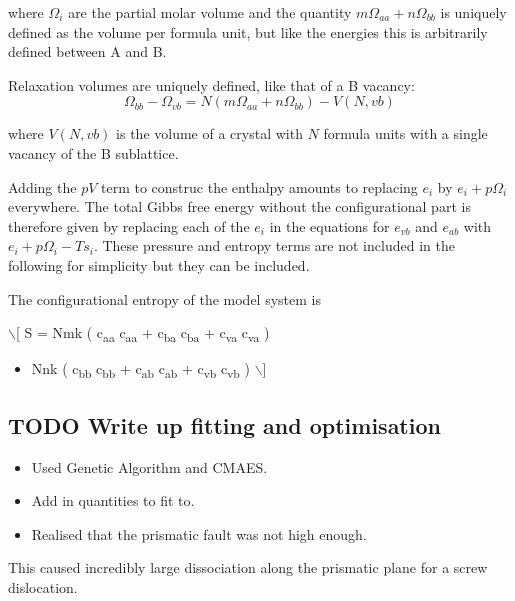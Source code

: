\documentclass[11pt]{article}
\begin{document}
where \(\Omega_i\) are the partial molar volume and the quantity \(m\Omega_{aa} +
n\Omega_{bb}\) is uniquely defined as the volume per formula unit, but like the
energies this is arbitrarily defined between A and B. 


Relaxation volumes are uniquely defined, like that of a B vacancy:
\[ \Omega_{bb} - \Omega_{vb} = N( m \Omega_{aa} + n \Omega_{bb} ) - V(N,vb)  \]

where \(V(N,vb)\) is the volume of a crystal with \(N\) formula units with a single
vacancy of the B sublattice. 

Adding the \(pV\) term to construc the enthalpy amounts to replacing \(e_i\) by
\(e_i + p\Omega_i\) everywhere. The total Gibbs free energy without the
configurational part is therefore given by replacing each of the \(e_i\) in the
equations for \(e_{vb}\) and \(e_{ab}\) with \(e_i + p\Omega_i - T s_i\). These
pressure and entropy terms are not included in the following for simplicity but
they can be included. 

The configurational entropy of the model system is 

$\backslash$[ S = Nmk ( c\textsubscript{aa}  c\textsubscript{aa} + c\textsubscript{ba}  c\textsubscript{ba} + c\textsubscript{va}  c\textsubscript{va} ) 
\begin{itemize}
\item Nnk ( c\textsubscript{bb}  c\textsubscript{bb} + c\textsubscript{ab}  c\textsubscript{ab} + c\textsubscript{vb}  c\textsubscript{vb} ) $\backslash$]
\end{itemize}

\subsection{{\bfseries\sffamily TODO} Write up fitting and optimisation}
\label{sec:org5790233}
\begin{itemize}
\item Used Genetic Algorithm and CMAES.
\item Add in quantities to fit to.
\end{itemize}


\begin{itemize}
\item Realised that the prismatic fault was not high enough.
\end{itemize}

This caused incredibly large dissociation along the prismatic plane for a
screw dislocation. 
\end{document}
